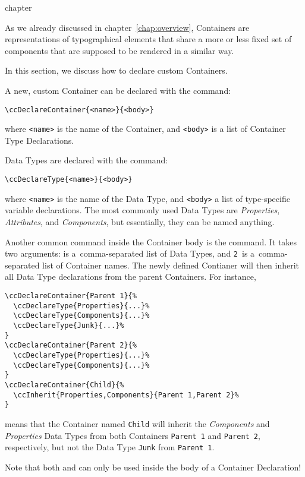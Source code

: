 \begin{Heading}{chapter}
\end{Heading}


As we already discussed in chapter~\ref{chap:overview},
Containers are representations of typographical
elements that share a more or less fixed set of components that are
supposed to be rendered in a similar way.

In this section, we discuss how to declare custom Containers.

A new, custom Container can be declared with the
\DeclareMacro{\ccDeclareContainer} command:
\begin{lstlisting}
\ccDeclareContainer{<name>}{<body>}
\end{lstlisting}
where \lstinline{<name>} is the name of the Container, and
\lstinline{<body>} is a list of Container Type Declarations.

Data Types are declared with the \DeclareMacro{\ccDeclareType} command:
\begin{lstlisting}
\ccDeclareType{<name>}{<body>}
\end{lstlisting}
where \lstinline{<name>} is the name of the Data Type, and
\lstinline{<body>} a list of type-specific variable declarations. The
most commonly used Data Types are \textit{Properties},
\textit{Attributes}, and \textit{Components}, but essentially, they
can be named anything.

Another common command inside the Container body is the
\DeclareMacro{\ccInherit} command. It takes two arguments:
 is a~comma-separated list of Data Types, and
\lstinline{2}~is a~comma-separated list of Container names. The newly
defined Contianer will then inherit all Data Type declarations from
the parent Containers. For instance,
\begin{lstlisting}
\ccDeclareContainer{Parent 1}{%
  \ccDeclareType{Properties}{...}%
  \ccDeclareType{Components}{...}%
  \ccDeclareType{Junk}{...}%
}
\ccDeclareContainer{Parent 2}{%
  \ccDeclareType{Properties}{...}%
  \ccDeclareType{Components}{...}%
}
\ccDeclareContainer{Child}{%
  \ccInherit{Properties,Components}{Parent 1,Parent 2}%
}
\end{lstlisting}
means that the Container named \lstinline{Child} will inherit the
\textit{Components} and \textit{Properties} Data Types from both
Containers \lstinline{Parent 1} and \lstinline{Parent 2},
respectively, but not the Data Type \lstinline{Junk} from \lstinline{Parent 1}.

Note that both \UsageMacro{\ccDeclareType} and \UsageMacro{\ccInherit}
can only be used inside the body of a Container Declaration!
